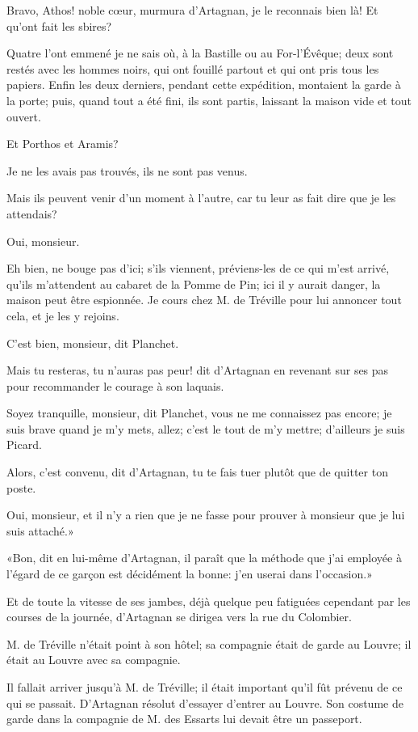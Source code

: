 \speak  Bravo, Athos! noble cœur, murmura d'Artagnan, je le reconnais bien là! Et qu'ont fait les sbires? 

\speak  Quatre l'ont emmené je ne sais où, à la Bastille ou au For-l'Évêque; deux sont restés avec les hommes noirs, qui ont fouillé partout et qui ont pris tous les papiers. Enfin les deux derniers, pendant cette expédition, montaient la garde à la porte; puis, quand tout a été fini, ils sont partis, laissant la maison vide et tout ouvert. 

\speak  Et Porthos et Aramis? 

\speak  Je ne les avais pas trouvés, ils ne sont pas venus. 

\speak  Mais ils peuvent venir d'un moment à l'autre, car tu leur as fait dire que je les attendais? 

\speak  Oui, monsieur. 

\speak  Eh bien, ne bouge pas d'ici; s'ils viennent, préviens-les de ce qui m'est arrivé, qu'ils m'attendent au cabaret de la Pomme de Pin; ici il y aurait danger, la maison peut être espionnée. Je cours chez M. de Tréville pour lui annoncer tout cela, et je les y rejoins. 

\speak  C'est bien, monsieur, dit Planchet. 

\speak  Mais tu resteras, tu n'auras pas peur! dit d'Artagnan en revenant sur ses pas pour recommander le courage à son laquais. 

\speak  Soyez tranquille, monsieur, dit Planchet, vous ne me connaissez pas encore; je suis brave quand je m'y mets, allez; c'est le tout de m'y mettre; d'ailleurs je suis Picard. 

\speak  Alors, c'est convenu, dit d'Artagnan, tu te fais tuer plutôt que de quitter ton poste. 

\speak  Oui, monsieur, et il n'y a rien que je ne fasse pour prouver à monsieur que je lui suis attaché.» 

«Bon, dit en lui-même d'Artagnan, il paraît que la méthode que j'ai employée à l'égard de ce garçon est décidément la bonne: j'en userai dans l'occasion.» 

Et de toute la vitesse de ses jambes, déjà quelque peu fatiguées cependant par les courses de la journée, d'Artagnan se dirigea vers la rue du Colombier. 

M. de Tréville n'était point à son hôtel; sa compagnie était de garde au Louvre; il était au Louvre avec sa compagnie. 

Il fallait arriver jusqu'à M. de Tréville; il était important qu'il fût prévenu de ce qui se passait. D'Artagnan résolut d'essayer d'entrer au Louvre. Son costume de garde dans la compagnie de M. des Essarts lui devait être un passeport. 

